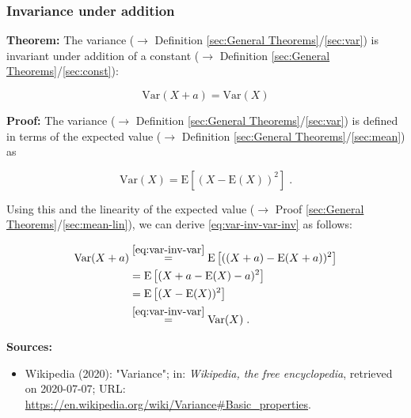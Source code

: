 \documentclass[a4paper,12pt,twoside]{book}
\begin{document}
\subsubsection[\textbf{Invariance under addition}]{Invariance under addition} \label{sec:var-inv}
\setcounter{equation}{0}

\textbf{Theorem:} The variance ($\rightarrow$ Definition \ref{sec:General Theorems}/\ref{sec:var}) is invariant under addition of a constant ($\rightarrow$ Definition \ref{sec:General Theorems}/\ref{sec:const}):

\begin{equation} \label{eq:var-inv-var-inv}
\mathrm{Var}(X+a) = \mathrm{Var}(X)
\end{equation}


\vspace{1em}
\textbf{Proof:} The variance ($\rightarrow$ Definition \ref{sec:General Theorems}/\ref{sec:var}) is defined in terms of the expected value ($\rightarrow$ Definition \ref{sec:General Theorems}/\ref{sec:mean}) as

\begin{equation} \label{eq:var-inv-var}
\mathrm{Var}(X) = \mathrm{E}\left[ (X-\mathrm{E}(X))^2 \right] \; .
\end{equation}

Using this and the linearity of the expected value ($\rightarrow$ Proof \ref{sec:General Theorems}/\ref{sec:mean-lin}), we can derive \eqref{eq:var-inv-var-inv} as follows:

\begin{equation} \label{eq:var-inv-var-inv-qed}
\begin{split}
\mathrm{Var}(X+a) &\overset{\eqref{eq:var-inv-var}}{=} \mathrm{E}\left[ ((X+a)-\mathrm{E}(X+a))^2 \right] \\
&= \mathrm{E}\left[ (X + a - \mathrm{E}(X) - a)^2 \right] \\
&= \mathrm{E}\left[ (X-\mathrm{E}(X))^2 \right] \\
&\overset{\eqref{eq:var-inv-var}}{=} \mathrm{Var}(X) \; . \\
\end{split}
\end{equation}


\vspace{1em}
\textbf{Sources:}
\begin{itemize}
\item Wikipedia (2020): "Variance"; in: \textit{Wikipedia, the free encyclopedia}, retrieved on 2020-07-07; URL: \url{https://en.wikipedia.org/wiki/Variance#Basic_properties}.
\end{itemize}
\end{document}
